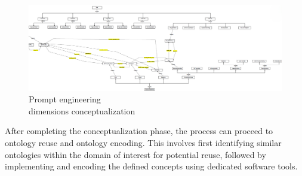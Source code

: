 \begin{figure}[H]
    \centering
    \includegraphics[width=0.9\linewidth]{Figures/fig_27.png}
    \caption{Prompt engineering\\ dimensions conceptualization}
    \label{fig:enter-label}
\end{figure}
After completing the conceptualization phase, the process can proceed to ontology reuse and ontology encoding. This involves first identifying similar ontologies within the domain of interest for potential reuse, followed by implementing and encoding the defined concepts using dedicated software tools.

